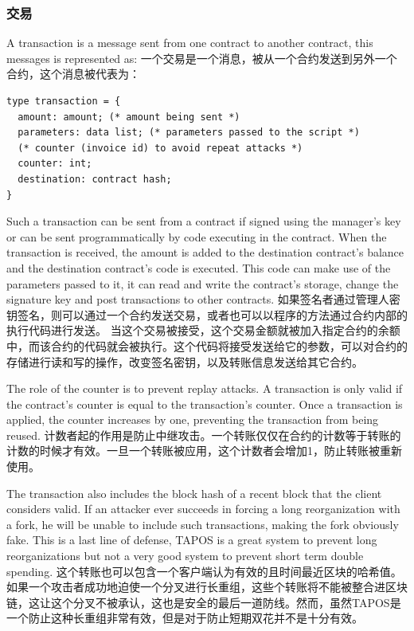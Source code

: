 \documentclass[letterpaper]{article}
\begin{document}
\subsubsection{交易}

A transaction is a message sent from one contract to another contract, this
messages is represented as:
一个交易是一个消息，被从一个合约发送到另外一个合约，这个消息被代表为：

\begin{lstlisting}
type transaction = {
  amount: amount; (* amount being sent *)
  parameters: data list; (* parameters passed to the script *)
  (* counter (invoice id) to avoid repeat attacks *)
  counter: int;
  destination: contract hash;
}
\end{lstlisting}

Such a transaction can be sent from a contract if signed using the manager's key
or can be sent programmatically by code executing in the contract. When the
transaction is received, the amount is added to the destination contract's
balance and the destination contract's code is executed. This code can make use
of the parameters passed to it, it can read and write the contract's storage,
change the signature key and post transactions to other contracts.
如果签名者通过管理人密钥签名，则可以通过一个合约发送交易，或者也可以以程序的方法通过合约内部的执行代码进行发送。
当这个交易被接受，这个交易金额就被加入指定合约的余额中，而该合约的代码就会被执行。这个代码将接受发送给它的参数，可以对合约的存储进行读和写的操作，改变签名密钥，以及转账信息发送给其它合约。

The role of the counter is to prevent replay attacks. A transaction is only
valid if the contract's counter is equal to the transaction's counter. Once a
transaction is applied, the counter increases by one, preventing the transaction
from being reused.
计数者起的作用是防止中继攻击。一个转账仅仅在合约的计数等于转账的计数的时候才有效。一旦一个转账被应用，这个计数者会增加1，防止转账被重新使用。

The transaction also includes the block hash of a recent block that the client
considers valid. If an attacker ever succeeds in forcing a long reorganization
with a fork, he will be unable to include such transactions, making the fork
obviously fake. This is a last line of defense, TAPOS is a great system to
prevent long reorganizations but not a very good system to prevent short term
double spending.
这个转账也可以包含一个客户端认为有效的且时间最近区块的哈希值。如果一个攻击者成功地迫使一个分叉进行长重组，这些个转账将不能被整合进区块链，这让这个分叉不被承认，这也是安全的最后一道防线。然而，虽然TAPOS是一个防止这种长重组非常有效，但是对于防止短期双花并不是十分有效。
\end{document}
